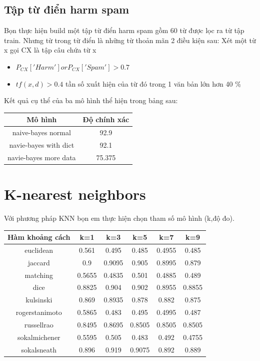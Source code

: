 \documentclass[a4paper,12pt]{report}
\begin{document}
\subsection{Tập từ điển harm spam}
Bọn thực hiện build một tập từ điển harm spam gồm 60 từ được lọc ra từ tập train. Nhưng từ trong từ điển là những từ thoản mãn 2 điều kiện sau:
Xét một từ x gọi CX là  tập câu chứa từ x
\begin{itemize}
\item $P_{CX}['Harm'] or P_{CX}['Spam'] >0.7$
\item $tf(x,d) >0.4$ tần số xuất hiện của từ đó trong 1 văn bản lớn hơn 40 \%
\end{itemize}
Kết quả cụ thể của ba mô hình thể hiện trong bảng sau:
\begin{longtable}{|c|c|}
\hline 
Mô hình & Độ chính xác \\ \hline
naive-bayes normal & 92.9\\ \hline
navie-bayes with dict & 92.1 \\ \hline
navie-bayes more data & 75.375\\ \hline
\end{longtable}


\section{K-nearest neighbors}
Với phương pháp KNN bọn em thực hiện chọn tham số mô hình (k,độ đo). 
\begin{longtable}{|c|c|c|c|c|c|}
\hline
Hàm khoảng cách & k=1 & k=3 & k=5 & k=7 & k=9\\
\hline
euclidean & 0.561 &0.495 &0.485&0.4955&0.485 \\
\hline 
jaccard & 0.9 & 0.9095 & 0.905 & 0.8995 & 0.879 \\ \hline
matching & 0.5655 & 0.4835 &  0.501 &0.4885 & 0.489 \\ \hline 
dice &0.8825 & 0.904 & 0.902 & 0.8955 & 0.8855 \\ \hline
kulsinski&  0.869 &0.8935& 0.878& 0.882 &0.875 \\ \hline 
rogerstanimoto&  0.5865& 0.483& 0.495 &0.4995& 0.487 \\ \hline
russellrao&  0.8495& 0.8695& 0.8505  &0.8505& 0.8505 \\ \hline 
sokalmichener& 0.5595& 0.505 &0.483 &0.492 &0.4755 \\ \hline 
sokalsneath& 0.896& 0.919  & 0.9075& 0.892 & 0.889 \\ \hline
\end{longtable}
\end{document}
